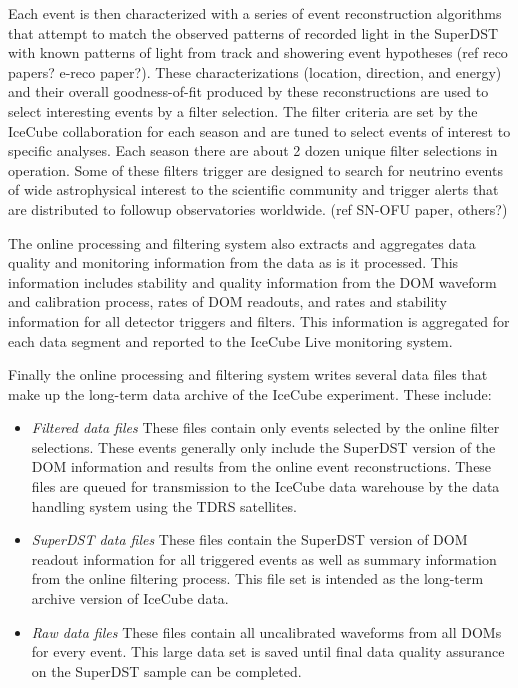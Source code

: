 Each event is then characterized with a series of event reconstruction algorithms that attempt to match
the observed patterns of recorded light in the SuperDST with known patterns of light
from track and showering event hypotheses (ref reco papers?  e-reco paper?).  These characterizations (location, direction, and energy) and their
overall goodness-of-fit produced by these reconstructions are used to select interesting
events by a filter selection.  The filter criteria are set by the IceCube collaboration for each season
and are tuned to select events of interest to specific analyses.  Each season there are
about 2 dozen unique filter selections in operation.  Some of these filters trigger are
designed to search for neutrino events of wide astrophysical interest to the scientific community and trigger
alerts that are distributed to followup observatories worldwide. (ref SN-OFU paper, others?)

The online processing and filtering system also extracts and aggregates data quality and monitoring information
from the data as is it processed.  This information includes stability and quality information from the
DOM waveform and calibration process, rates of DOM readouts, and rates and stability
information for all detector triggers and filters.  This information is aggregated for each data segment and
reported to the IceCube Live monitoring system.

Finally the online processing and filtering system writes several data files that make up the long-term data archive of the IceCube
experiment.  These include:
\begin{itemize}
\item \emph {Filtered data files} These files contain only events selected by the online filter selections.  These events
generally only include the SuperDST version of the DOM information and results from the online event reconstructions.  These
files are queued for transmission to the IceCube data warehouse by the data handling system using the TDRS satellites.
\item \emph {SuperDST data files} These files contain the SuperDST version of DOM readout information for all triggered events as well as summary
information from the online filtering process.  This file set is intended as the long-term archive version of IceCube data.
\item \emph {Raw data files}  These files contain all uncalibrated waveforms from all DOMs for every event.  This large data
set is saved until final data quality assurance on the SuperDST sample can be completed.
\end{itemize}


